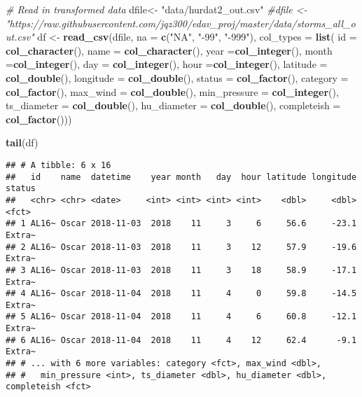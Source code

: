 \documentclass[]{book}
\newenvironment{Shaded}{\begin{snugshade}}{\end{snugshade}}
\newcommand{\CommentTok}[1]{\textcolor[rgb]{0.56,0.35,0.01}{\textit{#1}}}
\newcommand{\DataTypeTok}[1]{\textcolor[rgb]{0.13,0.29,0.53}{#1}}
\newcommand{\KeywordTok}[1]{\textcolor[rgb]{0.13,0.29,0.53}{\textbf{#1}}}
\newcommand{\NormalTok}[1]{#1}
\newcommand{\StringTok}[1]{\textcolor[rgb]{0.31,0.60,0.02}{#1}}
\begin{document}
\begin{Shaded}
\begin{Highlighting}[]
\CommentTok{# Read in transformed data}
\NormalTok{dfile<-}\StringTok{ "data/hurdat2_out.csv"}
\CommentTok{#dfile <- "https://raw.githubusercontent.com/jqz300/edav_proj/master/data/storms_all_out.csv"}
\NormalTok{df <-}\StringTok{ }\KeywordTok{read_csv}\NormalTok{(dfile,}
                   \DataTypeTok{na =} \KeywordTok{c}\NormalTok{(}\StringTok{"NA"}\NormalTok{, }\StringTok{"-99"}\NormalTok{, }\StringTok{"-999"}\NormalTok{),}
                   \DataTypeTok{col_types =} \KeywordTok{list}\NormalTok{(}
                     \DataTypeTok{id =} \KeywordTok{col_character}\NormalTok{(),}
                   \DataTypeTok{name =} \KeywordTok{col_character}\NormalTok{(),}
                   \DataTypeTok{year =}\KeywordTok{col_integer}\NormalTok{(),}
                   \DataTypeTok{month =}\KeywordTok{col_integer}\NormalTok{(),}
                   \DataTypeTok{day =} \KeywordTok{col_integer}\NormalTok{(),}
                   \DataTypeTok{hour  =}\KeywordTok{col_integer}\NormalTok{(),}
                   \DataTypeTok{latitude  =} \KeywordTok{col_double}\NormalTok{(),}
                   \DataTypeTok{longitude   =} \KeywordTok{col_double}\NormalTok{(),}
                   \DataTypeTok{status  =} \KeywordTok{col_factor}\NormalTok{(),}
                   \DataTypeTok{category =} \KeywordTok{col_factor}\NormalTok{(),}
                   \DataTypeTok{max_wind  =} \KeywordTok{col_double}\NormalTok{(),}
                   \DataTypeTok{min_pressure  =} \KeywordTok{col_integer}\NormalTok{(),}
                   \DataTypeTok{ts_diameter =} \KeywordTok{col_double}\NormalTok{(),}
                   \DataTypeTok{hu_diameter =} \KeywordTok{col_double}\NormalTok{(),}
                   \DataTypeTok{completeish =} \KeywordTok{col_factor}\NormalTok{()))}
\end{Highlighting}
\end{Shaded}

\begin{Shaded}
\begin{Highlighting}[]
\KeywordTok{tail}\NormalTok{(df)}
\end{Highlighting}
\end{Shaded}

\begin{verbatim}
## # A tibble: 6 x 16
##   id    name  datetime    year month   day  hour latitude longitude status
##   <chr> <chr> <date>     <int> <int> <int> <int>    <dbl>     <dbl> <fct> 
## 1 AL16~ Oscar 2018-11-03  2018    11     3     6     56.6     -23.1 Extra~
## 2 AL16~ Oscar 2018-11-03  2018    11     3    12     57.9     -19.6 Extra~
## 3 AL16~ Oscar 2018-11-03  2018    11     3    18     58.9     -17.1 Extra~
## 4 AL16~ Oscar 2018-11-04  2018    11     4     0     59.8     -14.5 Extra~
## 5 AL16~ Oscar 2018-11-04  2018    11     4     6     60.8     -12.1 Extra~
## 6 AL16~ Oscar 2018-11-04  2018    11     4    12     62.4      -9.1 Extra~
## # ... with 6 more variables: category <fct>, max_wind <dbl>,
## #   min_pressure <int>, ts_diameter <dbl>, hu_diameter <dbl>, completeish <fct>
\end{verbatim}
\end{document}
